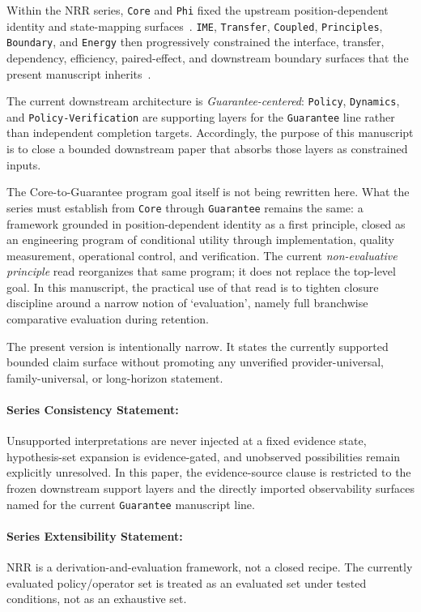 \documentclass[11pt]{article}
\begin{document}
Within the NRR series, \texttt{Core} and \texttt{Phi} fixed the upstream
position-dependent identity and state-mapping surfaces~\cite{saito2025nrr,saito2026phi}.
\texttt{IME}, \texttt{Transfer}, \texttt{Coupled}, \texttt{Principles},
\texttt{Boundary}, and \texttt{Energy} then progressively constrained the
interface, transfer, dependency, efficiency, paired-effect, and downstream
boundary surfaces that the present manuscript inherits~\cite{saito2026ime,saito2026transfer,saito2026coupled,saito2026principles,saito2026boundary,saito2026energy}.

The current downstream architecture is \textit{Guarantee-centered}: \texttt{Policy},
\texttt{Dynamics}, and \texttt{Policy-Verification} are supporting layers for the
\texttt{Guarantee} line rather than independent completion targets. Accordingly, the
purpose of this manuscript is to close a bounded downstream paper that absorbs those
layers as constrained inputs.

The Core-to-Guarantee program goal itself is not being rewritten here. What the
series must establish from \texttt{Core} through \texttt{Guarantee} remains the
same: a framework grounded in position-dependent identity as a first principle,
closed as an engineering program of conditional utility through
implementation, quality measurement, operational control, and verification. The
current \textit{non-evaluative principle} read reorganizes that same program; it
does not replace the top-level goal. In this manuscript, the practical use of
that read is to tighten closure discipline around a narrow notion of
`evaluation', namely full branchwise comparative evaluation during retention.

The present version is intentionally narrow. It states the currently supported
bounded claim surface without promoting any unverified provider-universal,
family-universal, or long-horizon statement.

\paragraph{Series Consistency Statement:}
Unsupported interpretations are never injected at a fixed evidence state,
hypothesis-set expansion is evidence-gated, and unobserved possibilities remain
explicitly unresolved. In this paper, the evidence-source clause is restricted to
the frozen downstream support layers and the directly imported observability
surfaces named for the current \texttt{Guarantee} manuscript line.

\paragraph{Series Extensibility Statement:}
NRR is a derivation-and-evaluation framework, not a closed recipe. The currently
evaluated policy/operator set is treated as an evaluated set under tested
conditions, not as an exhaustive set.
\end{document}
